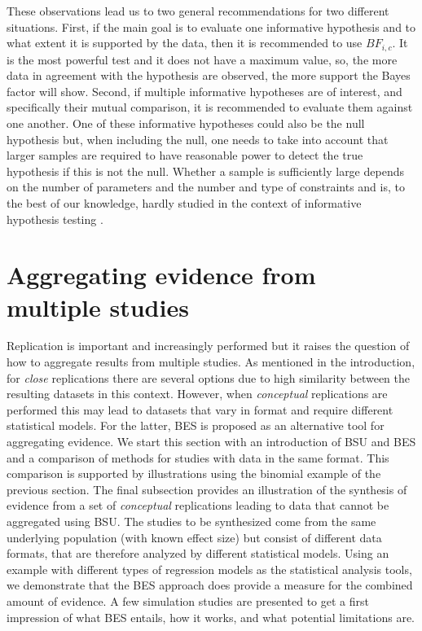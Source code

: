 \documentclass[11pt,reqno]{article}
\begin{document}
These observations lead us to two general recommendations for two different situations. First, if the main goal is to evaluate one informative hypothesis and to what extent it is supported by the data, then it is recommended to use $BF_{i,c}$. It is the most powerful test and it does not have a maximum value, so, the more data in agreement with the hypothesis are observed, the more support the Bayes factor will show. Second, if multiple informative hypotheses are of interest, and specifically their mutual comparison, it is recommended to evaluate them against one another. One of these informative hypotheses could also be the null hypothesis but, when including the null, one needs to take into account that larger samples are required to have reasonable power to detect the true hypothesis if this is not the null. Whether a sample is sufficiently large depends on the number of parameters and the number and type of constraints and is, to the best of our knowledge, hardly studied in the context of informative hypothesis testing \citep[for an exception in the context of comparing two means, see][]{fu_sample_2021}.





\section{Aggregating evidence from multiple studies}\label{Multiple}

Replication is important and increasingly performed but it raises the question of how to aggregate results from multiple studies. As mentioned in the introduction, for \textit{close} replications there are several options due to high similarity between the resulting datasets in this context. However, when \textit{conceptual} replications are performed this may lead to datasets that vary in format and require different statistical models. For the latter, BES is proposed as an alternative tool for aggregating evidence.
We start this section with an introduction of BSU and BES and a comparison of methods for studies with data in the same format. This comparison is supported by illustrations using the binomial example of the previous section.
The final subsection provides an illustration of the synthesis of evidence from a set of \textit{conceptual} replications leading to data that cannot be aggregated using BSU. The studies to be synthesized come from the same underlying population (with known effect size) but consist of different data formats, that are therefore analyzed by different statistical models. Using an example with different types of regression models as the statistical analysis tools, we demonstrate that the BES approach does provide a measure for the combined amount of evidence. A few simulation studies are presented to get a first impression of what BES entails, how it works, and what potential limitations are.
\end{document}
